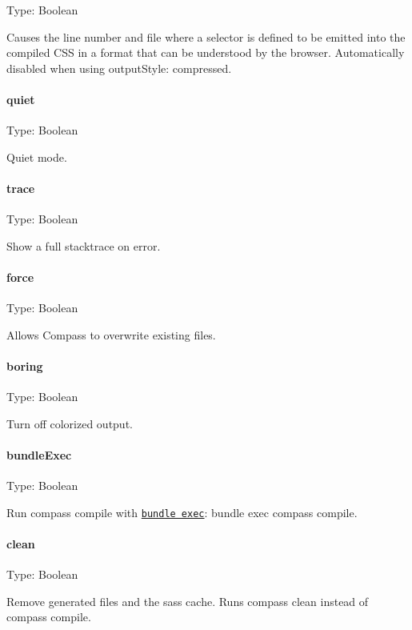 Type\+: {\ttfamily Boolean}

Causes the line number and file where a selector is defined to be emitted into the compiled C\+SS in a format that can be understood by the browser. Automatically disabled when using {\ttfamily output\+Style\+: \textquotesingle{}compressed\textquotesingle{}}.

\paragraph*{quiet}

Type\+: {\ttfamily Boolean}

Quiet mode.

\paragraph*{trace}

Type\+: {\ttfamily Boolean}

Show a full stacktrace on error.

\paragraph*{force}

Type\+: {\ttfamily Boolean}

Allows Compass to overwrite existing files.

\paragraph*{boring}

Type\+: {\ttfamily Boolean}

Turn off colorized output.

\paragraph*{bundle\+Exec}

Type\+: {\ttfamily Boolean}

Run {\ttfamily compass compile} with \href{http://gembundler.com/v1.3/man/bundle-exec.1.html}{\tt bundle exec}\+: {\ttfamily bundle exec compass compile}.

\paragraph*{clean}

Type\+: {\ttfamily Boolean}

Remove generated files and the sass cache. Runs {\ttfamily compass clean} instead of {\ttfamily compass compile}.

